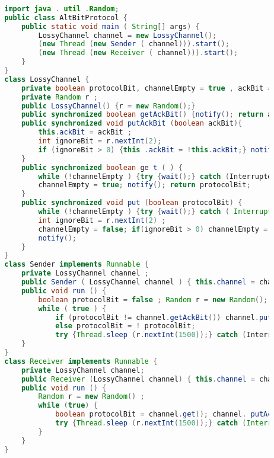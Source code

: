 \documentclass{article}
\begin{document}
	
	\begin{lstlisting}[language=Java]
		
		import java . util .Random;
		public class AltBitProtocol {
			public static void main ( String[] args) {
				LossyChannel channel = new LossyChannel();
				(new Thread (new Sender ( channel))).start();
				(new Thread (new Receiver ( channel))).start();
			}
		}
		class LossyChannel {
			private boolean protocolBit, channelEmpty = true , ackBit = true;
			private Random r ;
			public LossyChannel() {r = new Random();}
			public synchronized boolean getAckBit() {notify(); return ackBit;}
			public synchronized void putAckBit (boolean ackBit){
				this.ackBit = ackBit ;
				int ignoreBit = r.nextInt(2);
				if (ignoreBit > 0) {this .ackBit = !this.ackBit;} notify();
			}
			public synchronized boolean ge t ( ) {
				while (!channelEmpty ) {try {wait();} catch (InterruptedExceptione){}}
				channelEmpty = true; notify(); return protocolBit;
			}
			public synchronized void put (boolean protocolBit) {
				while (!channelEmpty ) {try {wait();} catch ( InterruptedException e){}}
				int ignoreBit = r.nextInt(2) ;
				channelEmpty = false; if(ignoreBit > 0) channelEmpty = true ;
				notify();
			}
		}
		class Sender implements Runnable {
			private LossyChannel channel ;
			public Sender ( LossyChannel channel ) { this.channel = channel; }
			public void run () {
				boolean protocolBit = false ; Random r = new Random();
				while ( true ) {
					if (protocolBit != channel.getAckBit()) channel.put (protocolBit);
					else protocolBit = ! protocolBit;
					try {Thread.sleep (r.nextInt(1500));} catch (InterruptedExption e){}}
			}
		}
		class Receiver implements Runnable {
			private LossyChannel channel;
			public Receiver (LossyChannel channel) { this.channel = channel;}
			public void run () {
				Random r = new Random() ;
				while (true) {
					boolean protocolBit = channel.get(); channel. putAckBit (protocolBit) ;
					try {Thread.sleep (r.nextInt(1500));} catch (InterruptedException e){}
				}
			}
		}
	\end{lstlisting}
\end{document}
